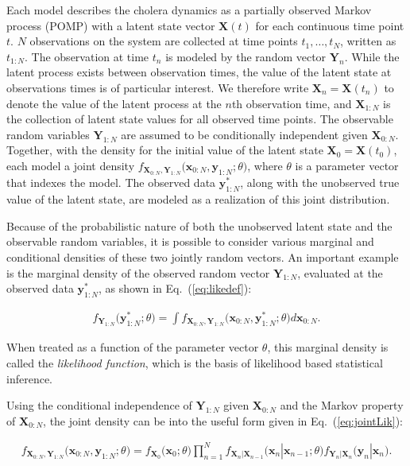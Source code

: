\documentclass[10pt,letterpaper]{article}\usepackage[]{graphicx}\usepackage[table]{xcolor}
\newcommand\paramVec{\theta}
\newcommand\myeqref[1]{(\ref{#1})}
\begin{document}
Each model describes the cholera dynamics as a partially observed Markov process (POMP) with a latent state vector $\bm{X}(t)$ for each continuous time point $t$.
$N$ observations on the system are collected at time points $t_1,\dots,t_N$, written as $t_{1:N}$.
The observation at time $t_n$ is modeled by the random vector $\bm{Y}_n$.
While the latent process exists between observation times, the value of the latent state at observations times is of particular interest.
We therefore write $\bm{X}_n = \bm{X}(t_n)$ to denote the value of the latent process at the $n$th observation time, and $\bm{X}_{1:N}$ is the collection of latent state values for all observed time points.
The observable random variables $\bm{Y}_{1:N}$ are assumed to be conditionally independent given $\bm{X}_{0:N}$.
Together, with the density for the initial value of the latent state $\bm{X}_{0} = \bm{X}(t_0)$, each model   a joint density $f_{\bm{X}_{0:N}, \bm{Y}_{1:N}}\big(\bm{x}_{0:N}, \bm{y}_{1:N};\paramVec\big)$, where $\paramVec$ is a parameter vector that indexes the model.
The observed data $\bm{y}_{1:N}^*$, along with the unobserved true value of the latent state, are modeled as a realization of this joint distribution.

Because of the probabilistic nature of both the unobserved latent state and the observable random variables, it is possible to consider various marginal and conditional densities of these two jointly random vectors.
An important example is the marginal density of the observed random vector $\bm{Y}_{1:N}$, evaluated at the observed data $\bm{y}_{1:N}^*$, as shown in Eq.~\myeqref{eq:likedef}:

\begin{eqnarray}
\label{eq:likedef}
f_{\bm{Y}_{1:N}}\big(\bm{y}_{1:N}^*; \paramVec\big) = \int f_{\bm{X}_{0:N}, \bm{Y}_{1:N}}\big(\bm{x}_{0:N}, \bm{y}_{1:N}^*;\paramVec\big) d\bm{x}_{0:N}.
\end{eqnarray}

\noindent When treated as a function of the parameter vector $\paramVec$, this marginal density is called the \emph{likelihood function}, which is the basis of likelihood based statistical inference.

Using the conditional independence of $\bm{Y}_{1:N}$ given $\bm{X}_{0:N}$ and the Markov property of $\bm{X}_{0:N}$, the joint density can be   into the useful form given in Eq.~\myeqref{eq:jointLik}:

\begin{eqnarray}
\label{eq:jointLik}
f_{\bm{X}_{0:N}, \bm{Y}_{1:N}}\big(\bm{x}_{0:N}, \bm{y}_{1:N};\paramVec\big) = f_{\bm{X}_0}\big(\bm{x}_0;\paramVec\big)\prod_{n = 1}^N f_{\bm{X}_n|\bm{X}_{n-1}}\big(\bm{x}_{n}|\bm{x}_{n-1}; \paramVec\big)f_{\bm{Y}_n|\bm{X}_{n}}\big(\bm{y}_n|\bm{x}_{n}\big).
\end{eqnarray}
\end{document}
